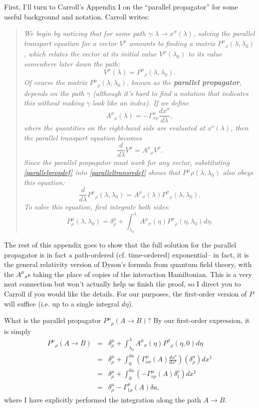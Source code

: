 First, I'll turn to Carroll's Appendix I on the ``parallel propagator'' for some useful background and notation. Carroll writes:
\begin{quotation}
\textit{We begin by noticing that for some path $\gamma:\lambda \to x^\sigma(\lambda)$, solving the parallel transport equation for a vector $V^\mu$ amounts to finding a matrix ${P^\mu}_\rho(\lambda,\lambda_0)$, which relates the vector at its initial value $V^\mu(\lambda_0)$ to its value somewhere later down the path:
\begin{equation}\label{parallelpropdef}
V^\mu(\lambda)={P^\mu}_\rho(\lambda,\lambda_0).
\end{equation}
Of course the matrix ${P^\mu}_\rho(\lambda,\lambda_0)$, known as the \textbf{parallel propagator}, depends on the path $\gamma$ (although it's hard to find a notation that indicates this without making $\gamma$ look like an index). If we define
$${A^\mu}_\rho(\lambda)=-\Gamma^\mu_{\sigma\rho}\frac{dx^\sigma}{d\lambda},$$ where the quantities on the right-hand side are evaluated at $x^\nu(\lambda)$, then the parallel transport equation becomes
\begin{equation}\label{paralleltransredef}
\frac{d}{d\lambda}V^\mu ={A^\mu}_\rho V^\rho.
\end{equation}
Since the parallel propagator must work for any vector, substituting \ref{parallelpropdef} into \ref{paralleltransredef} shows that ${P^\mu}\rho(\lambda,\lambda_0)$ also obeys this equation:
$$\frac{d}{d\lambda}{P^\mu}_\rho(\lambda,\lambda_0)={A^\mu}_\sigma(\lambda){P^\sigma}_\rho(\lambda,\lambda_0).$$
To solve this equation, first integrate both sides:
$$P^\mu_\rho(\lambda,\lambda_0)=\delta^\mu_\rho+\int_{\lambda_0}^\lambda {A^\mu}_\sigma(\eta){P^\sigma}_\rho(\eta,\lambda_0)d\eta.$$
}
\end{quotation}

The rest of this appendix goes to show that the full solution for the parallel propagator is in fact a path-ordered (cf. time-ordered) exponential-- in fact, it is the general relativity version of Dyson's formula from quantum field theory, with the ${A^\mu}_\sigma$s taking the place of copies of the interaction Hamiltonian. This is a very neat connection but won't actually help us finish the proof, so I direct you to Carroll if you would like the details. For our purposes, the first-order version of $P$ will suffice (i.e. up to a single integral $d\eta$).

What is the parallel propagator ${P^\mu}_\rho(A\to B)$? By our first-order expression, it is simply
\begin{eqnarray*}
{P^\mu}_\rho (A \to B)&=& \delta^\mu_\rho+ \int_{\lambda_0}^{\lambda} {A^\mu}_\sigma(\eta){P^\sigma}_\rho(\eta,0)d\eta\\
&=& \delta^\mu_\rho+ \int_{0}^{\delta a} \left(\Gamma^\mu_{\nu \sigma}(A) \frac{dx^\nu}{dx^1}\right) (\delta^\sigma_\rho) dx^1\\
&=&\delta^\mu_\rho +\int_0^{\delta a}(-\Gamma^\mu_{\nu \rho}(A) \delta^\nu_1) dx^1\\
&=&\delta^\mu_\rho -\Gamma^\mu_{1\rho}(A) \delta a,
\end{eqnarray*}
where I have explicitly performed the integration along the path $A\to B$. 

